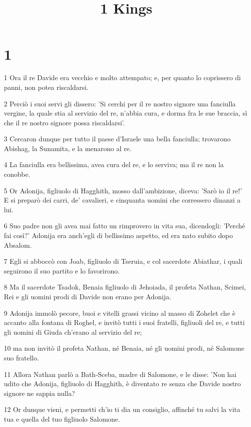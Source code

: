 

\title{1 Kings}


\chapter{1}

\par 1 Ora il re Davide era vecchio e molto attempato; e, per quanto lo coprissero di panni, non potea riscaldarsi.
\par 2 Perciò i suoi servi gli dissero: 'Si cerchi per il re nostro signore una fanciulla vergine, la quale stia al servizio del re, n'abbia cura, e dorma fra le sue braccia, sì che il re nostro signore possa riscaldarsi'.
\par 3 Cercaron dunque per tutto il paese d'Israele una bella fanciulla; trovarono Abishag, la Sunamita, e la menarono al re.
\par 4 La fanciulla era bellissima, avea cura del re, e lo serviva; ma il re non la conobbe.
\par 5 Or Adonija, figliuolo di Hagghith, mosso dall'ambizione, diceva: 'Sarò io il re!' E si preparò dei carri, de' cavalieri, e cinquanta uomini che corressero dinanzi a lui.
\par 6 Suo padre non gli avea mai fatto un rimprovero in vita sua, dicendogli: 'Perché fai così?' Adonija era anch'egli di bellissimo aspetto, ed era nato subito dopo Absalom.
\par 7 Egli si abboccò con Joab, figliuolo di Tseruia, e col sacerdote Abiathar, i quali seguirono il suo partito e lo favorirono.
\par 8 Ma il sacerdote Tsadok, Benaia figliuolo di Jehoiada, il profeta Nathan, Scimei, Rei e gli uomini prodi di Davide non erano per Adonija.
\par 9 Adonija immolò pecore, buoi e vitelli grassi vicino al masso di Zohelet che è accanto alla fontana di Roghel, e invitò tutti i suoi fratelli, figliuoli del re, e tutti gli uomini di Giuda ch'erano al servizio del re;
\par 10 ma non invitò il profeta Nathan, né Benaia, né gli uomini prodi, né Salomone suo fratello.
\par 11 Allora Nathan parlò a Bath-Sceba, madre di Salomone, e le disse: 'Non hai udito che Adonija, figliuolo di Hagghith, è diventato re senza che Davide nostro signore ne sappia nulla?
\par 12 Or dunque vieni, e permetti ch'io ti dia un consiglio, affinché tu salvi la vita tua e quella del tuo figliuolo Salomone.
